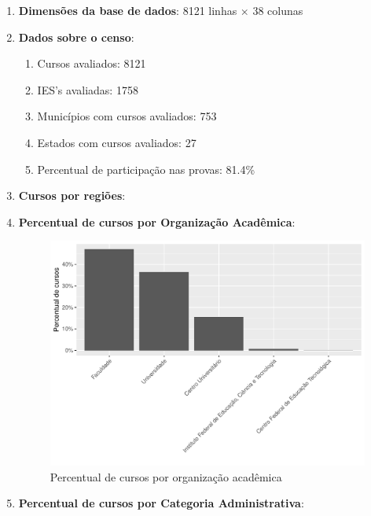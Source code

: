 	\begin{enumerate}
	\item \textbf{Dimensões da base de dados}: 8121  linhas $\times$  38  colunas

	\item \textbf{Dados sobre o censo}:
		\begin{enumerate}
		\item Cursos avaliados:  8121
		\item IES's avaliadas:  1758
		\item Municípios com cursos avaliados:  753
		\item Estados com cursos avaliados:  27
		\item Percentual de participação nas provas:  81.4\%
		\end{enumerate}
	\item \textbf{Cursos por regiões}:
	
	\pagebreak
	\item \textbf{Percentual de cursos por Organização Acadêmica}: 
	\begin{figure}[H]
		\centering
		\includegraphics[scale=.90]{../../graficos/latex-graph-percent-de-cursos-p-org-acad.pdf}
		\caption{Percentual de cursos por organização acadêmica}
		\label{fig: graf-percent-cursos-org-acad}
	\end{figure}
	\pagebreak
	\item \textbf{Percentual de cursos por Categoria Administrativa}:
	\begin{figure}[H]
		\centering

\end{figure}
\end{enumerate}
